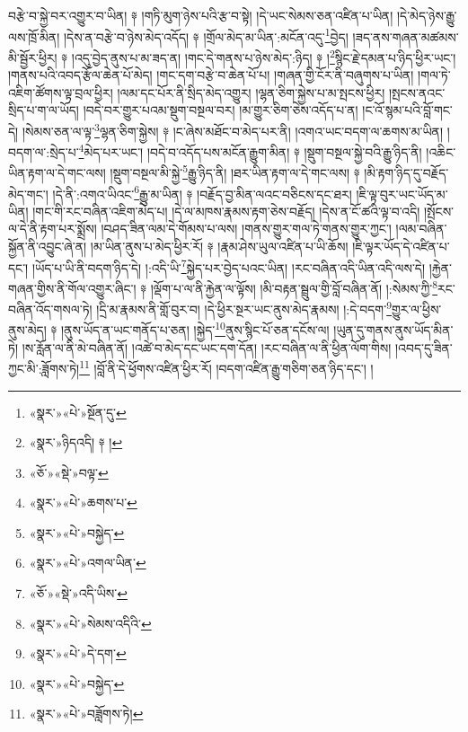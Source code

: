 བརྩེ་བ་སྐྱེ་བར་འགྱུར་བ་ཡིན། ༈ །གཏི་མུག་ཉེས་པའི་རྩ་བ་སྟེ། །དེ་ཡང་སེམས་ཅན་འཛིན་པ་ཡིན། །དེ་མེད་ཉེས་རྒྱུ་ལས་ཁྲོ་མིན། །དེས་ན་བརྩེ་བ་ཉེས་མེད་འདོད། ༈ །གྲོལ་མེད་མ་ཡིན་:མངོན་འདུ་\footnote{«སྣར་»«པེ་»སྔོན་དུ་}བྱེད། །ཟད་ནས་གཞན་མཚམས་མི་སྦྱོར་ཕྱིར། ༈ །འདུ་བྱེད་ནུས་པ་མ་ཟད་ན། །གང་དེ་གནས་པ་ཉེས་མེད་:ཉིད། ༈ །\footnote{«སྣར་»ཉིདའདི། ༈ །}སྙིང་རྗེ་དམན་པ་ཉིད་ཕྱིར་ཡང་། །གནས་པའི་འབད་རྩོལ་ཆེན་པོ་མེད། །གང་དག་བརྩེ་བ་ཆེན་པོ་པ། །གཞན་གྱི་ངོར་ནི་བཞུགས་པ་ཡིན། །གལ་ཏེ་འཇིག་ཚོགས་ལྟ་བྲལ་ཕྱིར། །ལམ་དང་པོར་ནི་སྲིད་མེད་འགྱུར། །ལྷན་ཅིག་སྐྱེས་པ་མ་སྤངས་ཕྱིར། །སྤངས་ནའང་སྲིད་པ་ག་ལ་ཡོད། །བདེ་བར་གྱུར་པའམ་སྡུག་བསྔལ་བར། །མ་གྱུར་ཅིག་ཅེས་འདོད་པ་ན། །ང་འོ་སྙམ་པའི་བློ་གང་དེ། །སེམས་ཅན་ལ་ལྟ་\footnote{«ཅོ་»«སྡེ་»བལྟ་}ལྷན་ཅིག་སྐྱེས། ༈ །ང་ཞེས་མཐོང་བ་མེད་པར་ནི། །འགའ་ཡང་བདག་ལ་ཆགས་མ་ཡིན། །བདག་ལ་:སྲེད་པ་\footnote{«སྣར་»«པེ་»ཆགས་པ་}མེད་པར་ཡང་། །བདེ་བ་འདོད་པས་མངོན་རྒྱུག་མིན། ༈ །སྡུག་བསྔལ་སྐྱེ་བའི་རྒྱུ་ཉིད་ནི། །འཆིང་ཡིན་རྟག་ལ་དེ་གང་ལས། །སྡུག་བསྔལ་མི་སྐྱེ་\footnote{«སྣར་»«པེ་»བསྐྱེད་}རྒྱུ་ཉིད་ནི། །ཐར་ཡིན་རྟག་ལ་དེ་གང་ལས། ༈ །མི་རྟག་ཉིད་དུ་བརྗོད་མེད་གང་། །དེ་ནི་:འགའ་ཡིའང་\footnote{«སྣར་»«པེ་»འགལ་ཡིན་}རྒྱུ་མ་ཡིན། ༈ །བརྗོད་བྱ་མིན་ལའང་བཅིངས་དང་ཐར། །ཇི་ལྟ་བུར་ཡང་ཡོད་མ་ཡིན། །གང་གི་རང་བཞིན་འཇིག་མེད་པ། །དེ་ལ་མཁས་རྣམས་རྟག་ཅེས་བརྗོད། །དེས་ན་ངོ་ཚའི་ལྟ་བ་འདི། །སྤོངས་ལ་དེ་ནི་རྟག་པར་སྨྲོས། །བཤད་ཟིན་ལམ་དེ་གོམས་པ་ལས། །གནས་གྱུར་གལ་ཏེ་གནས་གྱུར་ཀྱང་། །ལམ་བཞིན་སྐྱོན་ནི་འབྱུང་ཞེ་ན། །མ་ཡིན་ནུས་པ་མེད་ཕྱིར་རོ། ༈ །རྣམ་ཤེས་ཡུལ་འཛིན་པ་ཡི་ཆོས། །ཇི་ལྟར་ཡོད་དེ་འཛིན་པ་དང་། །ཡོད་པ་ཡི་ནི་བདག་ཉིད་དེ། །:འདི་ཡི་\footnote{«ཅོ་»«སྡེ་»འདི་ཡིས་}སྐྱེད་པར་བྱེད་པའང་ཡིན། །རང་བཞིན་འདི་ཡིན་འདི་ལས་དེ། །རྐྱེན་གཞན་གྱིས་ནི་གོལ་འགྱུར་ཞིང་། ༈ །ལྡོག་པ་ལ་ནི་རྐྱེན་ལ་ལྟོས། །མི་བརྟན་སྦྲུལ་གྱི་བློ་བཞིན་ནོ། །:སེམས་ཀྱི་\footnote{«སྣར་»«པེ་»སེམས་འདིའི་}རང་བཞིན་འོད་གསལ་ཏེ། །དྲི་མ་རྣམས་ནི་གློ་བུར་བ། །དེ་ཕྱིར་སྔར་ཡང་ནུས་མེད་རྣམས། །:དེ་བདག་\footnote{«སྣར་»«པེ་»དེ་དག་}གྱུར་ལ་ཕྱིས་ནུས་མེད། ༈ །ནུས་ཡོད་ན་ཡང་གནོད་པ་ཅན། །སྐྱེད་\footnote{«སྣར་»«པེ་»བསྐྱེད་}ནུས་སྙིང་པོ་ཅན་དངོས་ལ། །ཡུན་དུ་གནས་ནུས་ཡོད་མིན་ཏེ། །ས་རློན་ལ་ནི་མེ་བཞིན་ནོ། །འཚེ་བ་མེད་དང་ཡང་དག་དོན། །རང་བཞིན་ལ་ནི་ཕྱིན་ལོག་གིས། །འབད་དུ་ཟིན་ཀྱང་མི་:ཟློགས་ཏེ།\footnote{«སྣར་»«པེ་»བཟློགས་ཏེ།} །བློ་ནི་དེ་ཕྱོགས་འཛིན་ཕྱིར་རོ། །བདག་འཛིན་རྒྱུ་གཅིག་ཅན་ཉིད་དང་། །
